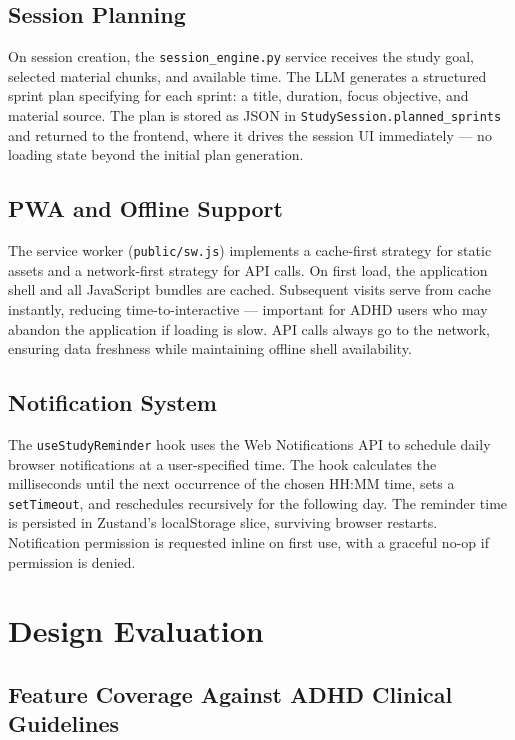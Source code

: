 \documentclass[conference]{IEEEtran}
\begin{document}
\subsection{Session Planning}

On session creation, the \texttt{session\_engine.py} service receives the study goal, selected material chunks, and available time. The LLM generates a structured sprint plan specifying for each sprint: a title, duration, focus objective, and material source. The plan is stored as JSON in \texttt{StudySession.planned\_sprints} and returned to the frontend, where it drives the session UI immediately — no loading state beyond the initial plan generation.

\subsection{PWA and Offline Support}

The service worker (\texttt{public/sw.js}) implements a cache-first strategy for static assets and a network-first strategy for API calls. On first load, the application shell and all JavaScript bundles are cached. Subsequent visits serve from cache instantly, reducing time-to-interactive — important for ADHD users who may abandon the application if loading is slow. API calls always go to the network, ensuring data freshness while maintaining offline shell availability.

\subsection{Notification System}

The \texttt{useStudyReminder} hook uses the Web Notifications API to schedule daily browser notifications at a user-specified time. The hook calculates the milliseconds until the next occurrence of the chosen HH:MM time, sets a \texttt{setTimeout}, and reschedules recursively for the following day. The reminder time is persisted in Zustand's localStorage slice, surviving browser restarts. Notification permission is requested inline on first use, with a graceful no-op if permission is denied.

\section{Design Evaluation}

\subsection{Feature Coverage Against ADHD Clinical Guidelines}
\end{document}
